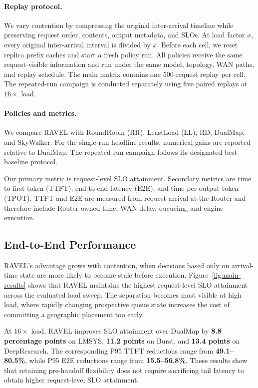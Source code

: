 \documentclass[letterpaper,twocolumn,10pt]{article}
\begin{document}
\paragraph{Replay protocol.}
We vary contention by compressing the original inter-arrival timeline while
preserving request order, contents, output metadata, and SLOs.
At load factor $x$, every original inter-arrival interval is divided by $x$.
Before each cell, we reset replica prefix caches and start a fresh policy run.
All policies receive the same request-visible information and run under the
same model, topology, WAN paths, and replay schedule.
The main matrix contains one 500-request replay per cell.
The repeated-run campaign is conducted separately using five paired replays at
$16\times$ load.

\paragraph{Policies and metrics.}
We compare RAVEL with RoundRobin (RR), LeastLoad (LL), RD, DualMap, and
SkyWalker.
For the single-run headline results, numerical gains are reported relative to
DualMap.
The repeated-run campaign follows its designated best-baseline protocol.

Our primary metric is request-level SLO attainment.
Secondary metrics are time to first token (TTFT), end-to-end latency (E2E), and
time per output token (TPOT).
TTFT and E2E are measured from request arrival at the Router and therefore
include Router-owned time, WAN delay, queueing, and engine execution.


\subsection{End-to-End Performance}
\label{sec:eval:e2e}

RAVEL's advantage grows with contention, when decisions based only on
arrival-time state are more likely to become stale before execution.
Figure~\ref{fig:main-results} shows that RAVEL maintains the highest
request-level SLO attainment across the evaluated load sweep.
The separation becomes most visible at high load, where rapidly changing
prospective queue state increases the cost of committing a geographic
placement too early.

At $16\times$ load, RAVEL improves SLO attainment over DualMap by
\textbf{8.8 percentage points} on LMSYS,
\textbf{11.2 points} on Burst, and
\textbf{13.4 points} on DeepResearch.
The corresponding P95 TTFT reductions range from
\textbf{49.1--80.5\%}, while P95 E2E reductions range from
\textbf{15.5--56.8\%}.
These results show that retaining pre-handoff flexibility does not require
sacrificing tail latency to obtain higher request-level SLO attainment.
\end{document}
